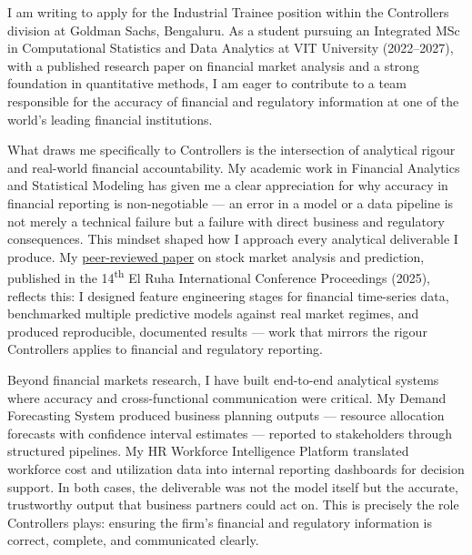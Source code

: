 \documentclass[a4paper,10pt]{article}
\newcommand{\ulink}[2]{\href{#1}{\uline{#2}}}
\begin{document}
{\fontsize{11}{14}\selectfont\color[HTML]{0A0A0A}

I am writing to apply for the Industrial Trainee position within the Controllers division at Goldman Sachs, Bengaluru. As a student pursuing an Integrated MSc in Computational Statistics and Data Analytics at VIT University (2022--2027), with a published research paper on financial market analysis and a strong foundation in quantitative methods, I am eager to contribute to a team responsible for the accuracy of financial and regulatory information at one of the world's leading financial institutions.

\vspace{9pt}

What draws me specifically to Controllers is the intersection of analytical rigour and real-world financial accountability. My academic work in Financial Analytics and Statistical Modeling has given me a clear appreciation for why accuracy in financial reporting is non-negotiable --- an error in a model or a data pipeline is not merely a technical failure but a failure with direct business and regulatory consequences. This mindset shaped how I approach every analytical deliverable I produce. My \ulink{https://www.elruha.org/_files/ugd/614b1f_6b95e1b697bf452b9907ba46e0151c05.pdf\#page=774}{peer-reviewed paper} on stock market analysis and prediction, published in the 14\textsuperscript{th} El Ruha International Conference Proceedings (2025), reflects this: I designed feature engineering stages for financial time-series data, benchmarked multiple predictive models against real market regimes, and produced reproducible, documented results --- work that mirrors the rigour Controllers applies to financial and regulatory reporting.

\vspace{9pt}

Beyond financial markets research, I have built end-to-end analytical systems where accuracy and cross-functional communication were critical. My Demand Forecasting System produced business planning outputs --- resource allocation forecasts with confidence interval estimates --- reported to stakeholders through structured pipelines. My HR Workforce Intelligence Platform translated workforce cost and utilization data into internal reporting dashboards for decision support. In both cases, the deliverable was not the model itself but the accurate, trustworthy output that business partners could act on. This is precisely the role Controllers plays: ensuring the firm's financial and regulatory information is correct, complete, and communicated clearly.

}
\end{document}
